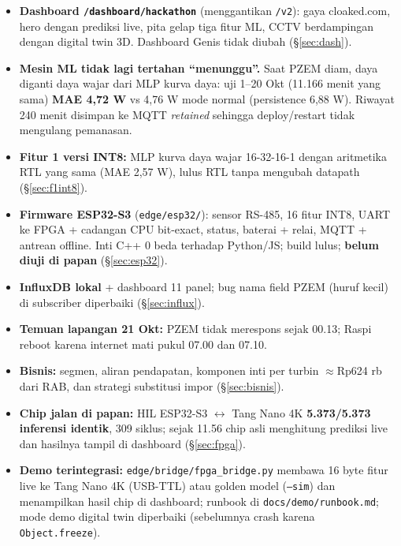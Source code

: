 \documentclass[10.5pt,a4paper]{article}
\newcommand{\cmd}[1]{\texttt{#1}}
\begin{document}
\begin{ringkas}
\begin{itemize}
  \item \textbf{Dashboard \cmd{/dashboard/hackathon}} (menggantikan \cmd{/v2}): gaya cloaked.com, hero dengan prediksi live, pita gelap tiga fitur ML, CCTV berdampingan dengan digital twin 3D. Dashboard Genis tidak diubah (\S\ref{sec:dash}).
  \item \textbf{Mesin ML tidak lagi tertahan ``menunggu''.} Saat PZEM diam, daya diganti daya wajar dari MLP kurva daya: uji 1--20 Okt (11.166 menit yang sama) \textbf{MAE 4,72 W} vs 4,76 W mode normal (persistence 6,88 W). Riwayat 240 menit disimpan ke MQTT \emph{retained} sehingga deploy/restart tidak mengulang pemanasan.
  \item \textbf{Fitur 1 versi INT8:} MLP kurva daya wajar 16-32-16-1 dengan aritmetika RTL yang sama (MAE 2,57 W), lulus RTL tanpa mengubah datapath (\S\ref{sec:f1int8}).
  \item \textbf{Firmware ESP32-S3} (\cmd{edge/esp32/}): sensor RS-485, 16 fitur INT8, UART ke FPGA + cadangan CPU bit-exact, status, baterai + relai, MQTT + antrean offline. Inti C++ 0 beda terhadap Python/JS; build lulus; \textbf{belum diuji di papan} (\S\ref{sec:esp32}).
  \item \textbf{InfluxDB lokal} + dashboard 11 panel; bug nama field PZEM (huruf kecil) di subscriber diperbaiki (\S\ref{sec:influx}).
  \item \textbf{Temuan lapangan 21 Okt:} PZEM tidak merespons sejak 00.13; Raspi reboot karena internet mati pukul 07.00 dan 07.10.
  \item \textbf{Bisnis:} segmen, aliran pendapatan, komponen inti per turbin $\approx$Rp624 rb dari RAB, dan strategi substitusi impor (\S\ref{sec:bisnis}).
  \item \textbf{Chip jalan di papan:} HIL ESP32-S3 $\leftrightarrow$ Tang Nano 4K \textbf{5.373/5.373 inferensi identik}, 309 siklus; sejak 11.56 chip asli menghitung prediksi live dan hasilnya tampil di dashboard (\S\ref{sec:fpga}).
  \item \textbf{Demo terintegrasi:} \cmd{edge/bridge/fpga\_bridge.py} membawa 16 byte fitur live ke Tang Nano 4K (USB-TTL) atau golden model (\cmd{--sim}) dan menampilkan hasil chip di dashboard; runbook di \cmd{docs/demo/runbook.md}; mode demo digital twin diperbaiki (sebelumnya crash karena \cmd{Object.freeze}).
\end{itemize}
\end{ringkas}
\end{document}

